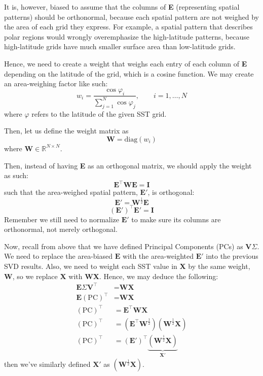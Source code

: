 \documentclass{article}
\begin{document}
It is, however, biased to assume that the columns of \textbf{E} (representing spatial patterns) should be orthonormal, because each spatial pattern are not weighed by the area of each grid they express.
For example, a spatial pattern that describes polar regions would wrongly overemphasize the high-latitude patterns, because high-latitude grids have much smaller surface area than low-latitude grids.

Hence, we need to create a weight that weighs each entry of each column of \textbf{E} depending on the latitude of the grid, which is a cosine function.
We may create an area-weighing factor like such: 
$$w_i = \frac{\cos\varphi_i}{\sum_{j=1}^{N} \cos\varphi_j}, \qquad i=1,\dots,N$$
where $\varphi$ refers to the latitude of the given SST grid.

Then, let us define the weight matrix as 
$$\textbf{W} = \text{diag}(w_i)$$
where $\textbf{W} \in \mathbb{R}^{N \times N}$.

Then, instead of having \textbf{E} as an orthogonal matrix, we should apply the weight as such:
$$\textbf{E}^\intercal \textbf{W} \textbf{E} = \textbf{I}$$
such that the area-weighed spatial pattern, $\textbf{E}'$, is orthogonal:
$$\textbf{E}' = \textbf{W}^{\frac{1}{2}} \textbf{E}$$
$$(\textbf{E}')^\intercal \textbf{E}' = \textbf{I}$$
Remember we still need to normalize $\textbf{E}'$ to make sure its columns are orthonormal, not merely orthogonal.

Now, recall from above that we have defined Principal Components (PCs) as $\textbf{V}\Sigma$.
We need to replace the area-biased $\textbf{E}$ with the area-weighted $\textbf{E}'$ into the previous SVD results.
Also, we need to weight each SST value in \textbf{X} by the same weight, \textbf{W}, so we replace \textbf{X} with \textbf{WX}.
Hence, we may deduce the following:
\begin{align*}
    \textbf{E} \Sigma \textbf{V}^\intercal &= \textbf{WX} \\
    \textbf{E} (\text{PC})^\intercal &= \textbf{WX} \\
    (\text{PC})^\intercal &= \textbf{E}^\intercal \textbf{WX} \\
    (\text{PC})^\intercal &= (\textbf{E}^\intercal \textbf{W}^{\frac{1}{2}}) (\textbf{W}^{\frac{1}{2}} \textbf{X}) \\
    (\text{PC})^\intercal &= (\textbf{E}')^\intercal \underbrace{(\textbf{W}^{\frac{1}{2}} \textbf{X})}_{\textbf{X}'}
\end{align*}
then we've similarly defined $\textbf{X}'$ as $(\textbf{W}^{\frac{1}{2}} \textbf{X})$.
\end{document}
